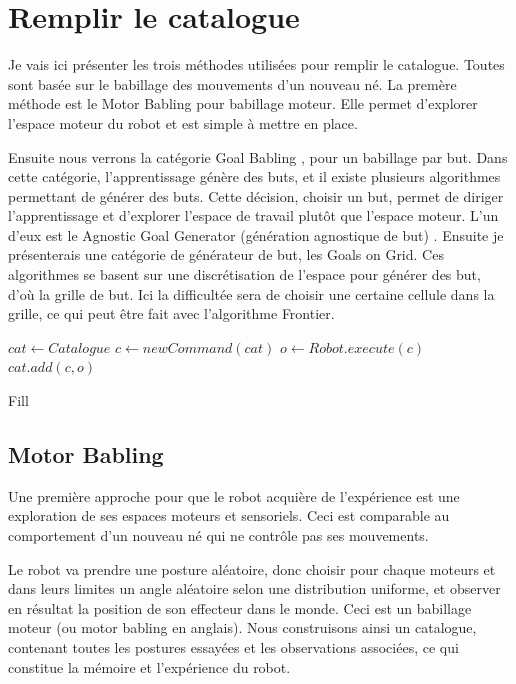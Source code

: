 \documentclass[11pt,french]{report}
\begin{document}
\section{Remplir le catalogue}

Je vais ici présenter les trois méthodes utilisées pour remplir le catalogue.
Toutes sont basée sur le babillage des mouvements d'un nouveau né.
La premère méthode est le Motor Babling pour babillage moteur.
Elle permet d'explorer l'espace moteur du robot et est simple à mettre en place.

\phantom{INVISIBLE LINE}

Ensuite nous verrons la catégorie Goal Babling \cite{GoalBabling}, pour un babillage par but.
Dans cette catégorie, l'apprentissage génère des buts, et il existe plusieurs algorithmes permettant de générer des buts.
Cette décision, choisir un but, permet de diriger l'apprentissage et d'explorer l'espace de travail plutôt que l'espace moteur.
L'un d'eux est le Agnostic Goal Generator (génération agnostique de but) .
Ensuite je présenterais une catégorie de générateur de but, les Goals on Grid.
Ces algorithmes se basent sur une discrétisation de l'espace pour générer des but, d'où la grille de but.
Ici la difficultée sera de choisir une certaine cellule dans la grille, ce qui peut être fait avec l'algorithme Frontier.

\begin{algorithm}[h]
    \DontPrintSemicolon
    \LinesNumbered
    $cat \leftarrow Catalogue$\;
     {
        $c \leftarrow newCommand(cat)$ \;
        $o \leftarrow Robot.execute(c)$\;
        $cat.add(c, o)$ \;
    }
    \caption{\label{alg:Fill} Fill}
\end{algorithm}

\clearpage

\subsection{Motor Babling}

Une première approche pour que le robot acquière de l'expérience est une exploration de ses espaces moteurs et sensoriels.
Ceci est comparable au comportement d'un nouveau né qui ne contrôle pas ses mouvements.

\phantom{INVISIBLE LINE}

Le robot va prendre une posture aléatoire, donc choisir pour chaque moteurs et dans leurs limites un angle aléatoire selon une distribution uniforme, et observer en résultat la position de son effecteur dans le monde.
Ceci est un babillage moteur (ou motor babling en anglais).
Nous construisons ainsi un catalogue, contenant toutes les postures essayées et les observations associées, ce qui constitue la mémoire et l'expérience du robot.
\end{document}
